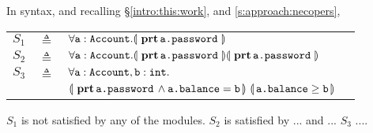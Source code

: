 In \Nec  syntax, and {recalling \S \ref{intro:this:work}, and \ref{s:approach:necopers},}
 
 \begin{tabular}{lcll}
$S_1$   &     $\triangleq$   & $\forall {{\texttt{a}}:{\texttt{Account}} }.{\llparenthesis}\, {\, \mathbf{prt}\, {\texttt{a.password}}\, } \,{\rrparenthesis} $
 \\
 $S_2$   & $\triangleq$   &  $\forall {{\texttt{a}}:{\texttt{Account}}}.{\llparenthesis}\, {\, \mathbf{prt}\, {\texttt{a.password}}\, } \,{\rrparenthesis}{\llparenthesis}\, {\, \mathbf{prt}\, {\texttt{a.password}}\, } \,{\rrparenthesis}$
 \\
$S_3$ & $\triangleq$   &
  $\forall {\texttt{a}}:{\texttt{Account}},{\texttt{b}}:{\texttt{int}}.$\\
  &  &  ${\llparenthesis}\, {\, \mathbf{prt}\, {\texttt{a.password}}\, } \wedge {\texttt{a.balance}}={\texttt{b}} \,{\rrparenthesis} 
\  {\llparenthesis}\,  {\texttt{a.balance}}\geq {\texttt{b}}  \,{\rrparenthesis}$
 \end{tabular}



 $S_1$ is not satisfied by any of the modules.
 $S_2$ is satisfied by ...  and ... 
 $S_3$ ....
 
 
% 
%
 


